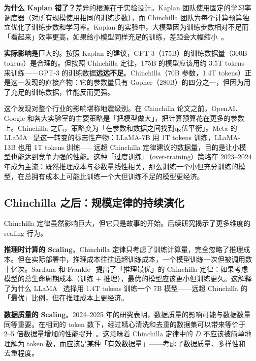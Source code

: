 \textbf{为什么 Kaplan 错了？}差异的根源在于实验设计。Kaplan 团队使用固定的学习率调度器（对所有规模使用相同的训练步数），而 Chinchilla 团队为每个计算预算独立优化了训练步数和学习率。Kaplan 的实验中，大模型因为训练步数相对不足而「看起来」效率更高，如果给小模型同样充足的训练，差距会大幅缩小~\cite{hoffmann2022chinchilla}。

\textbf{实际影响}是巨大的。按照 Kaplan 的建议，GPT-3（175B）的训练数据量（300B tokens）是合理的。但按照 Chinchilla 定律，175B 的模型应该用约 3.5T tokens 来训练——GPT-3 的训练数据\textbf{远远不足}。Chinchilla（70B 参数，1.4T tokens）正是这一发现的直接产物：它的参数量只有 Gopher（280B）的四分之一，但因为用了充足的训练数据，性能反而更强。

这个发现对整个行业的影响堪称地震级别。在 Chinchilla 论文之前，OpenAI、Google 和各大实验室的主要策略是「把模型做大」，把计算预算花在更多的参数上。Chinchilla 之后，策略变为「在参数和数据之间找到最优平衡」。Meta 的 LLaMA~\cite{touvron2023llama} 是这一转变的标志性产物：LLaMA-7B 用 1T tokens 训练，LLaMA-13B 也用 1T tokens 训练——远超 Chinchilla 定律建议的数据量，目的是让小模型也能达到竞争力强的性能。这种「过度训练」（over-training）策略在 2023--2024 年成为主流：既然推理成本与参数量线性相关，那么训练一个小但充分训练的模型，在总拥有成本上可能比训练一个大但训练不足的模型更经济。

\subsection{Chinchilla 之后：规模定律的持续演化}

Chinchilla 定律虽然影响巨大，但它只是故事的开始。后续研究揭示了更多维度的 scaling 行为。

\textbf{推理时计算的 Scaling}。Chinchilla 定律只考虑了训练计算量，完全忽略了推理成本。但在实际部署中，推理成本往往远超训练成本，一个模型训练一次但被调用数十亿次。Sardana 和 Frankle~\cite{sardana2024chinchilla} 提出了「推理最优」的 Chinchilla 定律：如果考虑模型的总生命周期成本（训练 + 推理），最优的模型应该更小但训练更久。这解释了为什么 LLaMA~\cite{touvron2023llama} 选择用 1.4T tokens 训练一个 7B 模型——远超 Chinchilla 的「最优」比例，但在推理成本上更经济。

\textbf{数据质量的 Scaling}。2024--2025 年的研究表明，数据质量的影响可能与数据数量同等重要。在相同的 token 数下，经过精心清洗和去重的数据集可以带来等价于 2--5 倍数据量增加的性能提升~\cite{penedo2024fineweb}。这意味着 Chinchilla 定律中的 $D$ 不应该被简单地理解为 token 数，而应该是某种「有效数据量」——考虑了数据质量、多样性和去重程度。

